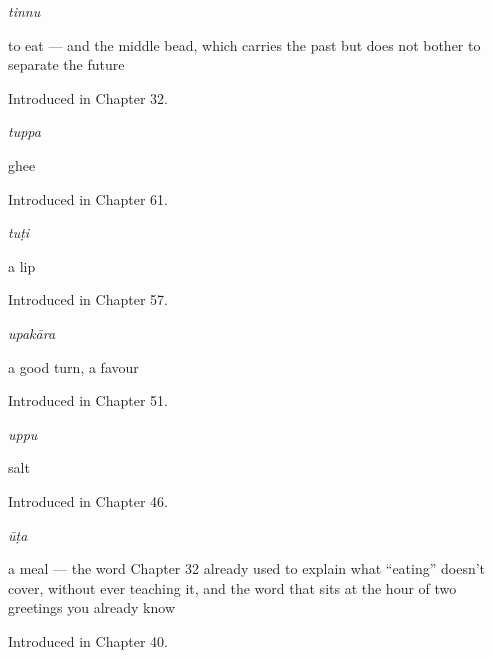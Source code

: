 \noindent\begin{minipage}[t]{\linewidth}
\raggedright
\textbf{}\enspace\emph{tinnu}\par
\small to eat — and the middle bead, which carries the past but does not bother to separate the future\par
\footnotesize Introduced in Chapter 32.
\end{minipage}\par\medskip

\noindent\begin{minipage}[t]{\linewidth}
\raggedright
\textbf{}\enspace\emph{tuppa}\par
\small ghee\par
\footnotesize Introduced in Chapter 61.
\end{minipage}\par\medskip

\noindent\begin{minipage}[t]{\linewidth}
\raggedright
\textbf{}\enspace\emph{tuṭi}\par
\small a lip\par
\footnotesize Introduced in Chapter 57.
\end{minipage}\par\medskip

\noindent\begin{minipage}[t]{\linewidth}
\raggedright
\textbf{}\enspace\emph{upakāra}\par
\small a good turn, a favour\par
\footnotesize Introduced in Chapter 51.
\end{minipage}\par\medskip

\noindent\begin{minipage}[t]{\linewidth}
\raggedright
\textbf{}\enspace\emph{uppu}\par
\small salt\par
\footnotesize Introduced in Chapter 46.
\end{minipage}\par\medskip

\noindent\begin{minipage}[t]{\linewidth}
\raggedright
\textbf{}\enspace\emph{ūṭa}\par
\small a meal — the word Chapter 32 already used to explain what \textquotedblleft{}eating\textquotedblright{} doesn't cover, without ever teaching it, and the word that sits at the hour of two greetings you already know\par
\footnotesize Introduced in Chapter 40.
\end{minipage}\par\medskip

